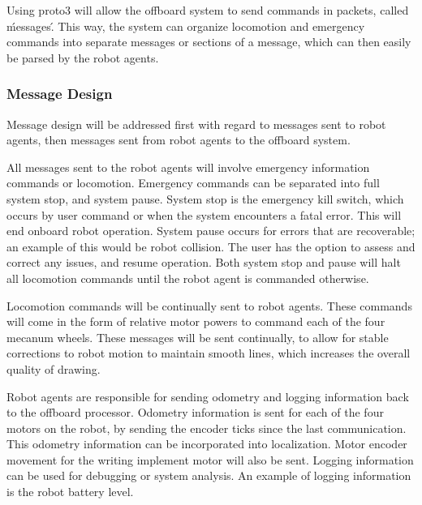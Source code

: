 Using proto3 will allow the offboard system to send commands in packets, called \'messages\'. This way, the system can organize locomotion and emergency commands into separate messages or sections of a message, which can then easily be parsed by the robot agents.

\subsubsection{Message Design}
\label{sec:software_comm_msg}
Message design will be addressed first with regard to messages sent to robot agents, then messages sent from robot agents to the offboard system.

All messages sent to the robot agents will involve emergency information commands or locomotion. Emergency commands can be separated into full system stop, and system pause. System stop is the emergency kill switch, which occurs by user command or when the system encounters a fatal error. This will end onboard robot operation. System pause occurs for errors that are recoverable; an example of this would be robot collision. The user has the option to assess and correct any issues, and resume operation. Both system stop and pause will halt all locomotion commands until the robot agent is commanded otherwise.

Locomotion commands will be continually sent to robot agents. These commands will come in the form of relative motor powers to command each of the four mecanum wheels. These messages will be sent continually, to allow for stable corrections to robot motion to maintain smooth lines, which increases the overall quality of drawing.

Robot agents are responsible for sending odometry and logging information back to the offboard processor. Odometry information is sent for each of the four motors on the robot, by sending the encoder ticks since the last communication. This odometry information can be incorporated into localization. Motor encoder movement for the writing implement motor will also be sent. Logging information can be used for debugging or system analysis. An example of logging information is the robot battery level.

